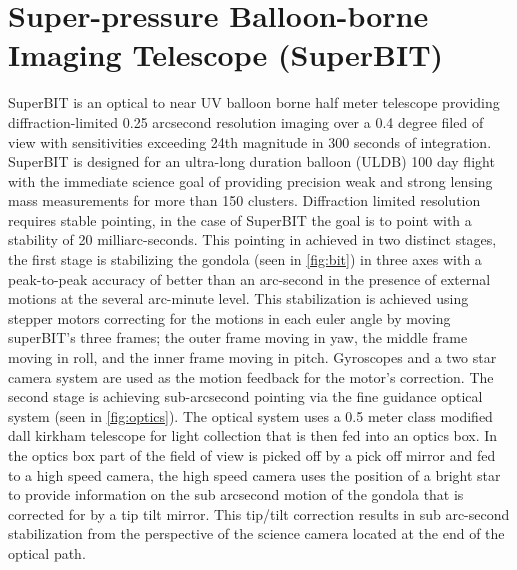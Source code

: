 \section{Super-pressure Balloon-borne Imaging Telescope (SuperBIT)}
SuperBIT is an optical to near UV balloon borne half meter telescope providing diffraction-limited 0.25 arcsecond resolution imaging over a 0.4 degree filed of view with sensitivities exceeding 24th magnitude in 300 seconds of integration. SuperBIT is designed for an ultra-long duration balloon (ULDB) 100 day flight with the immediate science goal of providing precision weak and strong lensing mass measurements for more than 150 clusters. Diffraction limited resolution requires stable pointing, in the case of SuperBIT the goal is to point with a stability of 20 milliarc-seconds. This pointing in achieved in two distinct stages, the first stage is stabilizing the gondola (seen in \autoref{fig:bit}) in three axes with a peak-to-peak accuracy of better than an arc-second in the presence of external motions at the several arc-minute level. This stabilization is achieved using stepper motors correcting for the motions in each euler angle by moving superBIT's three frames; the outer frame moving in yaw, the middle frame moving in roll, and the inner frame moving in pitch. Gyroscopes and a two star camera system are used as the motion feedback for the motor's correction. The second stage is achieving sub-arcsecond pointing via the fine guidance optical system (seen in \autoref{fig:optics}). The optical system uses a 0.5 meter class modified dall kirkham telescope for light collection that is then fed into an optics box. In the optics box part of the field of view is picked off by a pick off mirror and fed to a high speed camera, the high speed camera uses the position of a bright star to provide information on the sub arcsecond motion of the gondola that is corrected for by a tip tilt mirror. This tip/tilt correction results in sub arc-second stabilization from the perspective of the science camera located at the end of the optical path. 


